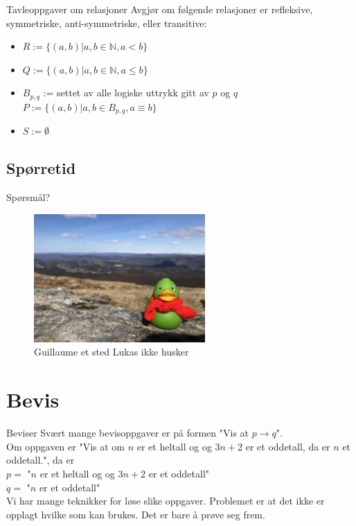 \begin{frame}{Tavleoppgaver om relasjoner}
Avgjør om følgende relasjoner er refleksive, symmetriske, anti-symmetriske, eller transitive:\\
    \begin{itemize}
        \item $R := \{(a, b) | a, b \in \mathbb{N}, a < b\}$
        \item $Q := \{(a, b) | a, b \in \mathbb{N}, a \leq b\}$
        \item $B_{p, q}$ := settet av alle logiske uttrykk gitt av $p$ og $q$\\
              $P := \{(a, b) | a, b \in B_{p, q}, a \equiv b\}$
        \item $S := \emptyset$
    \end{itemize}
\end{frame}

\subsection*{Spørretid}
\begin{frame}{Spørsmål?}
    \begin{figure}
        \centering
        \includegraphics[height = 4.9cm]{images/guillaume3.jpg}
        \caption{Guillaume et sted Lukas ikke husker}
        \label{fig:guillaume3}
    \end{figure}
\end{frame}

\section{Bevis}

\begin{frame}{Beviser}
    Svært mange bevisoppgaver er på formen "Vis at $p \rightarrow q$".\\
    
    Om oppgaven er "Vis at om $n$ er et heltall og og $3n+2$ er et oddetall, da er $n$ et oddetall.", da er \\
    $p = $ "$n$ er et heltall og og $3n+2$ er et oddetall" \\
    $q = $ "$n$ er et oddetall"\\
    
Vi har mange teknikker for løse slike oppgaver. Problemet er at det ikke er opplagt hvilke som kan brukes. Det er bare å prøve seg frem.
\end{frame}

